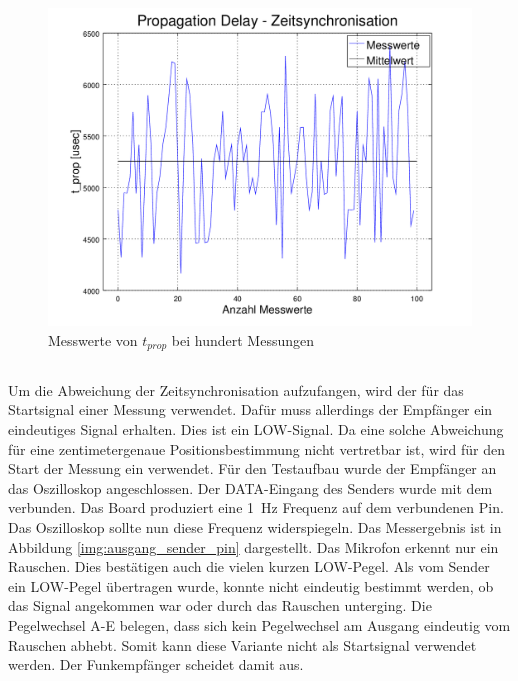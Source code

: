 \begin{figure}[H]
\centering
\hspace*{-1.7cm}
\includegraphics[width=1.2\textwidth]{images/t_prop_zeit_sync_figure.png}
\caption{Messwerte von $t_{prop}$ bei hundert Messungen}
\label{img:zeit_sync_t_prop_figure}
\end{figure}

\subsection{\funkempfaenger}
Um die Abweichung der Zeitsynchronisation aufzufangen, wird der \funkempfaenger \platz für das Startsignal einer Messung verwendet. Dafür muss allerdings der Empfänger ein eindeutiges Signal erhalten. Dies ist ein \si{LOW}-Signal. Da eine solche Abweichung für eine zentimetergenaue Positionsbestimmung nicht vertretbar ist, wird für den Start der Messung ein \funkempfaenger \platz verwendet. Für den Testaufbau wurde der Empfänger an das Oszilloskop angeschlossen. Der \si{DATA}-Eingang des Senders wurde mit dem \board \platz verbunden. Das Board produziert eine \SI{1}{\hertz} Frequenz auf dem verbundenen Pin. Das Oszilloskop sollte nun diese Frequenz widerspiegeln. Das Messergebnis ist in Abbildung \ref{img:ausgang_sender_pin} dargestellt. Das Mikrofon erkennt nur ein Rauschen. Dies bestätigen auch die vielen kurzen \si{LOW}-Pegel. Als vom Sender ein \si{LOW}-Pegel übertragen wurde, konnte nicht eindeutig bestimmt werden, ob das Signal angekommen war oder durch das Rauschen unterging. Die Pegelwechsel A-E belegen, dass sich kein Pegelwechsel am Ausgang eindeutig vom Rauschen abhebt. Somit kann diese Variante nicht als Startsignal verwendet werden. Der Funkempfänger scheidet damit aus.

